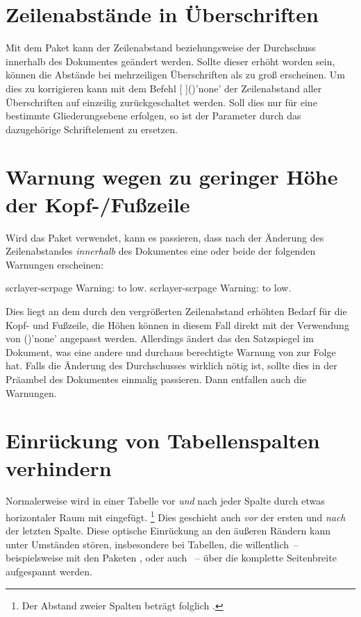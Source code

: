 \section{Zeilenabstände in Überschriften}
%
%
Mit dem Paket  kann der Zeilenabstand beziehungsweise der 
Durchschuss innerhalb des Dokumentes geändert werden. Sollte dieser erhöht 
worden sein, können die Abstände bei mehrzeiligen Überschriften als zu groß 
erscheinen. Um dies zu korrigieren kann mit dem Befehl 
[%
]()'none'
der Zeilenabstand aller Überschriften auf einzeilig zurückgeschaltet werden. 
Soll dies nur für eine bestimmte Gliederungsebene erfolgen, so ist der 
Parameter  durch das dazugehörige Schriftelement zu 
ersetzen.



\section{Warnung wegen zu geringer Höhe der Kopf-/Fußzeile}
%
%
Wird das Paket  verwendet, kann es passieren, dass nach der 
Änderung des Zeilenabstandes \emph{innerhalb} des Dokumentes eine oder beide 
der folgenden Warnungen erscheinen:
%
\begin{quoting}
\begin{Code}
scrlayer-scrpage Warning: \headheight to low.
scrlayer-scrpage Warning: \footheight to low.
\end{Code}
\end{quoting}
%
Dies liegt an dem durch den vergrößerten Zeilenabstand erhöhten Bedarf für die
Kopf- und Fußzeile, die Höhen können in diesem Fall direkt mit der Verwendung 
von ()'none' angepasst werden. 
Allerdings ändert das den Satzspiegel im Dokument, was eine andere und durchaus 
berechtigte Warnung von  zur Folge hat. Falls die Änderung 
des Durchschusses wirklich nötig ist, sollte dies in der Präambel des 
Dokumentes einmalig passieren. Dann entfallen auch die Warnungen.



\section{Einrückung von Tabellenspalten verhindern}%
%
%
Normalerweise wird in einer Tabelle vor \emph{und} nach jeder Spalte durch 
 etwas horizontaler Raum mit  
eingefügt.%
\footnote{%
  Der Abstand zweier Spalten beträgt folglich .%
}
Dies geschieht auch \emph{vor} der ersten und \emph{nach} der letzten Spalte. 
Diese optische Einrückung an den äußeren Rändern kann unter Umständen stören, 
insbesondere bei Tabellen, die willentlich~-- beispielsweise mit den Paketen 
,  oder auch ~-- über die 
komplette Seitenbreite aufgespannt werden.

